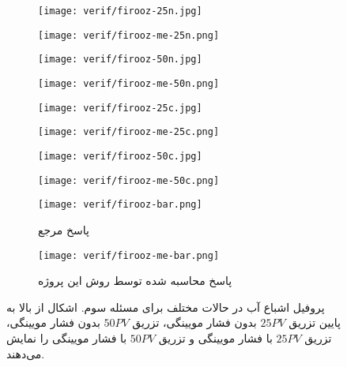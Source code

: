 \begin{figure}
\begin{subfigure}{0.5\textwidth} %
\texttt{[image: verif/firooz-25n.jpg]} 
\end{subfigure}
\begin{subfigure}{0.5\textwidth} %
\texttt{[image: verif/firooz-me-25n.png]}
\end{subfigure}
\begin{subfigure}{0.5\textwidth} %
\texttt{[image: verif/firooz-50n.jpg]} 
\end{subfigure}
\begin{subfigure}{0.5\textwidth} %
\texttt{[image: verif/firooz-me-50n.png]} 
\end{subfigure}
\begin{subfigure}{0.5\textwidth} %
\texttt{[image: verif/firooz-25c.jpg]} 
\end{subfigure}
\begin{subfigure}{0.5\textwidth} %
\texttt{[image: verif/firooz-me-25c.png]} 
\end{subfigure}
\begin{subfigure}{0.5\textwidth} %
\texttt{[image: verif/firooz-50c.jpg]} 
\end{subfigure}
\begin{subfigure}{0.5\textwidth} %
\texttt{[image: verif/firooz-me-50c.png]}
\end{subfigure}
\begin{subfigure}{0.5\textwidth} %
\texttt{[image: verif/firooz-bar.png]} 
\caption{پاسخ مرجع \cite{hoteitf}}
\label{fig:4firoozres-him}
\end{subfigure}
\begin{subfigure}{0.5\textwidth} %
\texttt{[image: verif/firooz-me-bar.png]}
\caption{پاسخ محاسبه شده توسط روش این پروژه}
\label{fig:4firoozres-me}
\end{subfigure}
\caption[پروفیل اشباع آب در حالات مختلف برای مسئله سوم]{پروفیل اشباع آب در حالات مختلف برای مسئله سوم. اشکال از بالا به پایین تزریق $25 PV$ بدون فشار مویینگی، تزریق $50 PV$ بدون فشار مویینگی، تزریق $25 PV$ با فشار مویینگی و تزریق $50 PV$ با فشار مویینگی را نمایش می‌دهند. }
\label{fig:4firoozres}
\end{figure}


